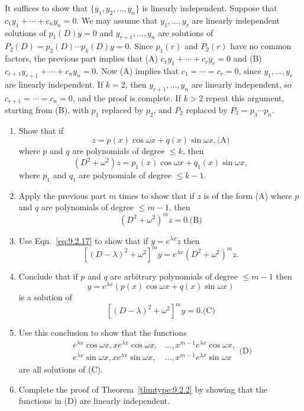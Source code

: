 \documentclass{ximera}
\begin{document}
\begin{problem}
\begin{enumerate}
\begin{solution}
It suffices to show that
 $\{y_1,y_2,\dots,y_n\}$ is linearly independent. Suppose that
$c_1y_1+\cdots+c_ny_n=0$. We may assume that $y_1,\dots,y_r$
are linearly independent solutions of $p_1(D)y=0$ and
$y_{r+1},\dots,y_n$ are solutions of
$P_2(D)=p_2(D)\cdots p_k(D)y=0$. Since $p_1(r)$ and $P_2(r)$ have no
common factors,
the previous part implies
that (A) $c_1y_1+\cdots+c_ry_r=0$ and
(B) $c_{r+1}y_{r+1}+\cdots+c_ny_n=0$.
Now (A) implies that $c_1=\cdots=c_r=0$, since $y_1,\dots,y_r$
are linearly independent. If $k=2$, then $y_{r+1},\dots,y_n$
are linearly independent, so $c_{r+1}=\cdots=c_n=0$, and the proof is
complete. If $k>2$ repeat this argument, starting from (B), with $p_1$
replaced by $p_2$, and $P_2$ replaced by $P_3=p_3\cdots p_n$.
\end{solution}
\end{enumerate}
\end{problem}

\begin{problem}\label{exer:9.2.41}
\begin{enumerate}
\item %
Show that if
$$
z=p(x)\cos\omega x+q(x)\sin\omega x,
\text{(A)}
$$
where $p$ and $q$ are polynomials of degree $\le k$, then
$$
(D^2+\omega^2)z=p_1(x)\cos\omega x+q_1(x)\sin\omega x,
$$
where $p_1$ and $q_1$ are polynomials of degree $\le k-1$.

\item %
Apply the previous part $m$ times to show that if $z$ is of
the form (A) where $p$ and $q$ are polynomials of
degree $\le m-1$, then
$$
(D^2+\omega^2)^mz=0.
\text{(B)}
$$

\item %
Use Eqn.~\eqref{eq:9.2.17} to show that if $y=e^{\lambda x}z$ then
$$
[(D-\lambda)^2+\omega^2]^my=e^{\lambda
x}(D^2+\omega^2)^mz.
$$

\item %
Conclude that if $p$ and $q$ are arbitrary polynomials of degree $\le m-1$ then
$$
y=e^{\lambda x}(p(x)\cos\omega x+q(x)\sin\omega x)
$$
is a solution of
$$
[(D-\lambda)^2+\omega^2]^my=0.
\text{(C)}
$$

\item %
Use this conclusion to show that the functions
$$
\begin{array}{rl}
e^{\lambda x}\cos\omega x, xe^{\lambda x}\cos\omega x,
&\dots, x^{m-1}e^{\lambda x}\cos\omega x,\\
e^{\lambda x}\sin\omega x, xe^{\lambda x}\sin\omega x,&
\dots, x^{m-1}e^{\lambda x}\sin\omega x
\end{array}
\text{(D)}
$$
are all solutions of (C).

\item %
Complete the proof of Theorem~\ref{thmtype:9.2.2} by showing that the
functions in (D) are linearly independent.
\end{enumerate}
\end{problem}
\end{document}

